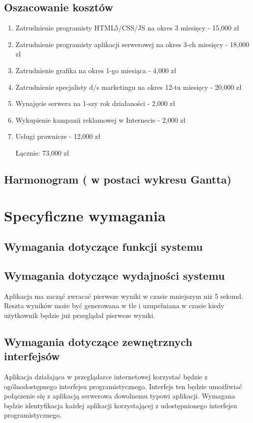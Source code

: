 \documentclass[12pt,a4paper]{report}
\begin{document}
\subsection{Oszacowanie kosztów}
\begin{enumerate}
	\item Zatrudnienie programisty HTML5/CSS/JS na okres 3 miesięcy - 15,000 zł
	\item Zatrudnienie programisty aplikacji serwerowej na okres 3-ch miesięcy - 18,000 zł
	\item Zatrudnienie grafika na okres 1-go miesiąca - 4,000 zł
	\item Zatrudnienie specjalisty d/s marketingu na okres 12-tu miesięcy - 20,000 zł
	\item Wynajęcie serwera na 1-szy rok działaności - 2,000 zł
	\item Wykupienie kampanii reklamowej w Internecie - 2,000 zł
	\item Usługi prawnicze - 12,000 zł

Łącznie: 73,000 zł
\end{enumerate}
\subsection{Harmonogram ( w postaci wykresu Gantta)}
\section{Specyficzne wymagania}
\subsection{Wymagania dotyczące funkcji systemu}
\subsection{Wymagania dotyczące wydajności systemu}
	Aplikacja ma zacząć zwracać pierwsze wyniki w czasie mniejszym niż 5 sekund. Reszta wyników może być generowana w tle i uzupełniana w czasie kiedy użytkownik będzie już przeglądał pierwsze wyniki.
\subsection{Wymagania dotyczące zewnętrznych interfejsów}
Aplikacja działająca w przeglądarce internetowej korzystać będzie z ogólnodostępnego interfejsu programistycznego. Interfejs ten będzie umożliwiać połączenie się z aplikacją serwerowa dowolnemu typowi aplikacji. Wymagana będzie identyfikacja każdej aplikacji korzystającej z udostępnionego interfejsu programistycznego.
\end{document}
